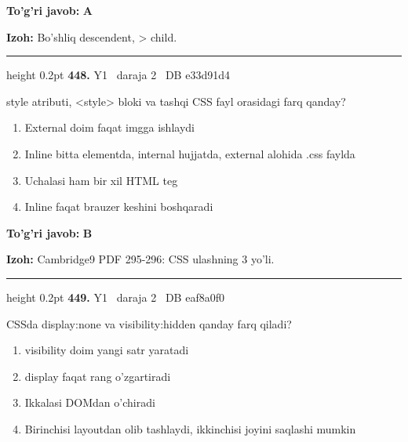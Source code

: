 \documentclass[10pt,a4paper,oneside]{article}
\begin{document}
\begin{tcolorbox}[enhanced,breakable,colback=teal!4,colframe=teal!45!black,boxrule=0.45pt,arc=1.2mm,left=2.8mm,right=2.8mm,top=2mm,bottom=2mm,before skip=2mm,after skip=2mm]
\textbf{\color{teal}To'g'ri javob:} \textbf{A}
\par\smallskip
\textbf{Izoh:} Bo'shliq descendent, \textgreater{} child.
\end{tcolorbox}
\vspace{2mm}\hrule height 0.2pt \vspace{4mm}
\hypertarget{q448}{\textbf{\color{ink}448.}}  {\color{muted}\scriptsize Y1 \textbullet\ daraja 2 \textbullet\ DB e33d91d4}
\par
style atributi, \textless{}style\textgreater{} bloki va tashqi CSS fayl orasidagi farq qanday?
\begin{enumerate}[label=\Alph*),leftmargin=9mm]
\item External doim faqat imgga ishlaydi
\item Inline bitta elementda, internal hujjatda, external alohida .css faylda
\item Uchalasi ham bir xil HTML teg
\item Inline faqat brauzer keshini boshqaradi
\end{enumerate}
\begin{tcolorbox}[enhanced,breakable,colback=teal!4,colframe=teal!45!black,boxrule=0.45pt,arc=1.2mm,left=2.8mm,right=2.8mm,top=2mm,bottom=2mm,before skip=2mm,after skip=2mm]
\textbf{\color{teal}To'g'ri javob:} \textbf{B}
\par\smallskip
\textbf{Izoh:} Cambridge9 PDF 295-296: CSS ulashning 3 yo'li.
\end{tcolorbox}
\vspace{2mm}\hrule height 0.2pt \vspace{4mm}
\hypertarget{q449}{\textbf{\color{ink}449.}}  {\color{muted}\scriptsize Y1 \textbullet\ daraja 2 \textbullet\ DB eaf8a0f0}
\par
CSSda display:none va visibility:hidden qanday farq qiladi?
\begin{enumerate}[label=\Alph*),leftmargin=9mm]
\item visibility doim yangi satr yaratadi
\item display faqat rang o'zgartiradi
\item Ikkalasi DOMdan o'chiradi
\item Birinchisi layoutdan olib tashlaydi, ikkinchisi joyini saqlashi mumkin
\end{enumerate}
\end{document}
